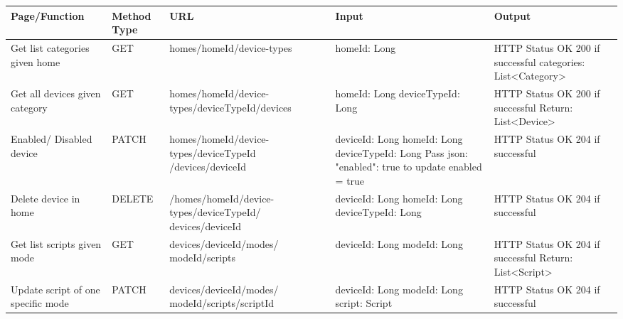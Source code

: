 \documentclass[12pt,a4paper,oneside]{extbook}
\begin{document}
{\scriptsize
\begin{longtable}{|p{2.5cm}|p{1.2cm}|p{3.3cm}|p{3cm}|p{4cm}|}

\hline 
\multicolumn{1}{|p{2.5cm}|}{\textbf{Page/Function}} & \multicolumn{1}{p{1.2cm}|}{\textbf{Method Type}} & \multicolumn{1}{p{3.3cm}|}{\textbf{URL}} & \multicolumn{1}{p{3cm}|}{\textbf{Input}} & \multicolumn{1}{p{4cm}|}{\textbf{Output}} \\ \hline 
\endhead

\hline
Get list categories given home & GET &	homes/{homeId}/device-types	& 
homeId: Long &
HTTP Status OK 200 if successful\newline
categories: List<Category>\\

\hline
Get all devices given category & 	GET &	homes/{homeId}/device-types/{deviceTypeId}/\newline devices &	homeId: Long\newline
deviceTypeId: Long &	HTTP Status OK 200 if successful
Return: List<Device>\\

\hline
Enabled/
Disabled device	& PATCH &	homes/{homeId}/device-types/{deviceTypeId}
/devices/{deviceId} &	
deviceId: Long\newline
homeId: Long\newline
deviceTypeId: Long\newline
Pass json: {"enabled": true}
to update enabled = true &	
HTTP Status OK 204 if successful\\

\hline
Delete device in home &	DELETE &	/homes/{homeId}/device-types/{deviceTypeId}/
devices/{deviceId} &	
deviceId: Long\newline
homeId: Long\newline
deviceTypeId: Long &	HTTP Status OK 204 if successful\\

\hline
Get list scripts given mode	& GET &	devices/{deviceId}/modes/
{modeId}/scripts &	deviceId: Long\newline
modeId: Long &	
HTTP Status OK 204 if successful\newline
Return: List<Script>\\

\hline
Update script of one specific mode &	PATCH &	devices/{deviceId}/modes/
{modeId}/scripts/{scriptId} &	
deviceId: Long\newline
modeId: Long\newline
script: Script &	HTTP Status OK 204 if successful\\


\end{longtable}}
\end{document}
